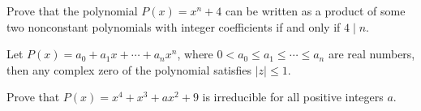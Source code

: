 \documentclass[11pt]{scrartcl}
\begin{document}
\begin{problem}[11]{}
Prove that the polynomial $P(x) = x^n+4$ can be written as a product of some two nonconstant polynomials with integer coefficients if and only if $4 \mid n$.
\end{problem}
\begin{problem}[12]{}
Let $P(x) = a_0 + a_1x + \cdots + a_nx^n$, where $0 < a_0 \le a_1 \le \cdots \le a_n$ are real numbers, then any complex zero of the polynomial satisfies $|z| \le 1$.
\end{problem}
\begin{problem}[13]{}
Prove that $P(x) = x^4+x^3+ax^2 + 9$ is irreducible for all positive integers $a$.
\end{problem}
\end{document}
